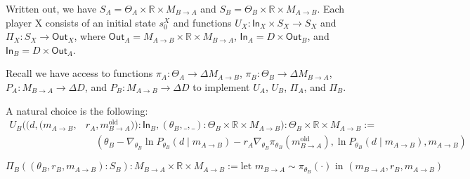 \documentclass{article}
\theoremstyle{definition}
\begin{document}
Written out, we have $S_A = \Theta_A \times \mathbb{R} \times M_{B\rightarrow A}$ and $S_B = \Theta_B \times \mathbb{R} \times M_{A \rightarrow B}$.
Each player X consists of an initial state $s_0^X$ and functions $U_X : \mathsf{In}_X \times S_X \rightarrow S_X$ and $\Pi_X : S_X \rightarrow \mathsf{Out}_X$, where $\mathsf{Out}_A = M_{A \rightarrow B} \times \mathbb{R} \times M_{B \rightarrow A}$, $\mathsf{In}_A = D \times \mathsf{Out}_B$, and $\mathsf{In}_B = D \times \mathsf{Out}_A$.

Recall we have access to functions $\pi_A : \Theta_A \rightarrow \Delta M_{A \rightarrow B}$, $\pi_B : \Theta_B \rightarrow \Delta M_{B \rightarrow A}$, $P_A : M_{B \rightarrow A} \rightarrow \Delta D$, and $P_B : M_{A \rightarrow B} \rightarrow \Delta D$ to implement $U_A$, $U_B$, $\Pi_A$, and $\Pi_B$.

A natural choice is the following:
\begin{align*}
U_B((d, (m_{A\rightarrow B}, &r_A, m_{B \rightarrow A}^{\text{old}})) : \mathsf{In}_B, (\theta_B, \_, \_) : \Theta_B \times \mathbb{R} \times M_{A \rightarrow B}) : \Theta_B \times \mathbb{R} \times M_{A \rightarrow B} := \\
&\quad (\theta_B - \nabla_{\theta_B} \ln P_{\theta_B} (d \mid m_{A \rightarrow B}) - r_A \nabla_{\theta_B} \pi_{\theta_B} (m_{B \rightarrow A}^{\text{old}}), \ln P_{\theta_B} (d \mid m_{A \rightarrow B}), m_{A \rightarrow B})
\end{align*}

$$\Pi_B((\theta_B, r_B, m_{A \rightarrow B}) : S_B) : M_{B \rightarrow A} \times \mathbb{R} \times M_{A \rightarrow B} := \text{let } m_{B \rightarrow A} \sim \pi_{\theta_B}(\cdot) \text{ in } (m_{B \rightarrow A}, r_B, m_{A \rightarrow B})$$
\end{document}
